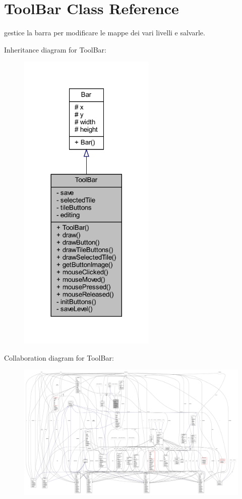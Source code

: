 \hypertarget{classui_1_1_tool_bar}{}\section{Tool\+Bar Class Reference}
\label{classui_1_1_tool_bar}


gestice la barra per modificare le mappe dei vari livelli e salvarle.  




Inheritance diagram for Tool\+Bar\+:
\nopagebreak
\begin{figure}[H]
\begin{center}
\leavevmode
\includegraphics[width=185pt]{classui_1_1_tool_bar__inherit__graph}
\end{center}
\end{figure}


Collaboration diagram for Tool\+Bar\+:
\nopagebreak
\begin{figure}[H]
\begin{center}
\leavevmode
\includegraphics[width=350pt]{classui_1_1_tool_bar__coll__graph}
\end{center}
\end{figure}
